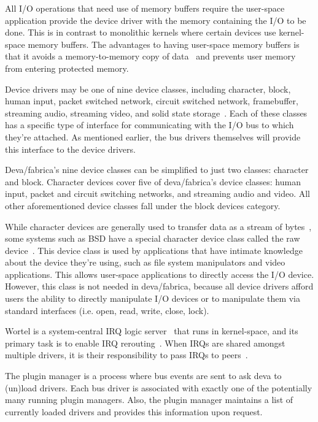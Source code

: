 All I/O operations that need use of memory buffers require
the user-space application provide the device driver with the memory
containing the I/O to be done.  This is in contrast to monolithic kernels
where certain devices use kernel-space memory buffers.  The advantages to
having user-space memory buffers is that it avoids a memory-to-memory
copy of data~\cite{hurdl4ref2003, mckusick1996, l4ref2005} and prevents
user memory from entering protected memory.


Device drivers may be one of nine device classes, including
character, block, human input, packet switched network, circuit switched
network, framebuffer, streaming audio, streaming video, and solid state
storage~\cite{hurdl4ref2003}.  Each of these classes has a specific type of
interface for communicating with the I/O bus to which they're attached.  As
mentioned earlier, the bus drivers themselves will provide this interface to
the device drivers.

Deva/fabrica's nine device classes can be simplified to just
two classes: {\important character} and {\important block}.  Character
devices cover five of deva/fabrica's device classes: human input,
packet and circuit switching networks, and streaming audio and video.
All other aforementioned device classes fall under the block devices
category.

While character devices are generally used to transfer data as a stream of
bytes~\cite{mckusick1996}, some systems such as BSD have a special character
device class called the {\important raw device}~\cite{mckusick1996}.
This device class is used by applications that have intimate knowledge
about the device they're using, such as file system manipulators and video
applications.  This allows user-space applications to directly access the
I/O device.  However, this class is not needed in deva/fabrica, because all
device drivers afford users the ability to directly manipulate I/O devices
or to manipulate them via standard interfaces (i.e. open, read, write,
close, lock).


{\important Wortel} is a system-central IRQ logic
server~\cite{hurdl4ref2003} that runs in kernel-space, and its primary
task is to enable IRQ rerouting~\cite{hurdl4ref2003}.  When IRQs are
shared amongst multiple drivers, it is their responsibility to pass
IRQs to peers~\cite{hurdl4ref2003}.

The {\important plugin manager} is a process where bus events are sent to ask
deva to (un)load drivers.  Each bus driver is associated with exactly one
of the potentially many running plugin managers.  Also, the plugin
manager maintains a list of currently loaded drivers and provides this
information upon request.

